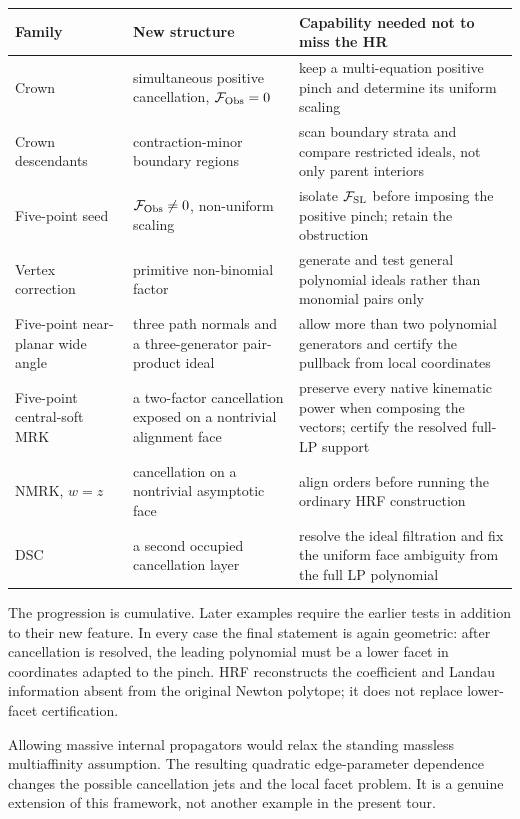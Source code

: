 \documentclass[a4paper,11pt]{article}
\newcommand{\FSL}{\mathcal F_{\rm SL}}
\newcommand{\FObs}{\mathcal F_{\rm Obs}}
\begin{document}
\begin{center}
\small
\begin{tabular}{@{}>{\raggedright\arraybackslash}p{}
                    >{\raggedright\arraybackslash}p{}
                    >{\raggedright\arraybackslash}p{}@{}}
\toprule
Family & New structure & Capability needed not to miss the HR\\
\midrule
Crown & simultaneous positive cancellation, \(\FObs=0\) & keep a
multi-equation positive pinch and determine its uniform scaling\\
Crown descendants & contraction-minor boundary regions & scan boundary
strata and compare restricted ideals, not only parent interiors\\
Five-point seed & \(\FObs\ne0\), non-uniform scaling & isolate \(\FSL\)
before imposing the positive pinch; retain the obstruction\\
Vertex correction & primitive non-binomial factor & generate and test
general polynomial ideals rather than monomial pairs only\\
Five-point near-planar wide angle & three path normals and a
three-generator pair-product ideal & allow more than two polynomial
generators and certify the pullback from local coordinates\\
Five-point central-soft MRK & a two-factor cancellation exposed on a
nontrivial alignment face & preserve every native kinematic power when
composing the vectors; certify the resolved full-LP support\\
NMRK, \(w=z\) & cancellation on a nontrivial asymptotic face & align
orders before running the ordinary HRF construction\\
DSC & a second occupied cancellation layer & resolve the ideal filtration
and fix the uniform face ambiguity from the full LP polynomial\\
\bottomrule
\end{tabular}
\end{center}

The progression is cumulative.  Later examples require the earlier tests in
addition to their new feature.  In every case the final statement is again
geometric: after cancellation is resolved, the leading polynomial must be a
lower facet in coordinates adapted to the pinch.  HRF reconstructs the
coefficient and Landau information absent from the original Newton polytope;
it does not replace lower-facet certification.

Allowing massive internal propagators would relax the standing massless
multiaffinity assumption.  The resulting quadratic edge-parameter dependence
changes the possible cancellation jets and the local facet problem.  It is a
genuine extension of this framework, not another example in the present
tour.
\end{document}
